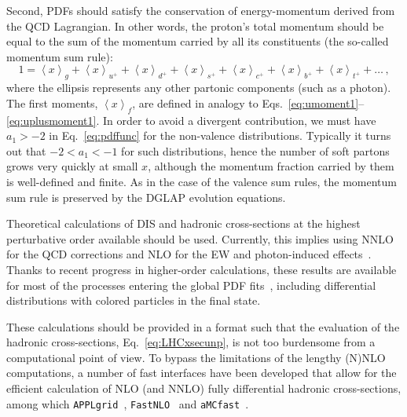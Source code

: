 Second, PDFs should satisfy the conservation of energy-momentum derived from
the QCD Lagrangian.
%
In other words, the proton's total momentum should be equal 
to the sum of the momentum carried by all its constituents
(the so-called momentum sum rule):
\begin{equation}
\label{eq:mom}
1 
= 
\left\langle x\right\rangle _{g}
+
\left\langle x\right\rangle _{u^{+}}
+
\left\langle x\right\rangle _{d^{+}}
+
\left\langle x\right\rangle _{s^{+}}
+
\left\langle x\right\rangle _{c^{+}}
+
\left\langle x\right\rangle _{b^{+}}
+
\left\langle x\right\rangle _{t^{+}}+\ldots\,,
\end{equation}
%
where the ellipsis represents any other partonic components (such
as a photon). 
%
The first moments, $\left\langle x\right\rangle _{f}$, are defined in analogy 
to Eqs.~\eqref{eq:umoment1}--\eqref{eq:uplusmoment1}. 
%
In order to avoid a divergent contribution, we must have $a_1>-2$ in 
Eq.~\eqref{eq:pdffunc} for the non-valence distributions.
%
Typically it turns out that $-2<a_1<-1$ for such distributions, hence 
the number of soft partons grows very quickly at small $x$, although the 
momentum fraction carried by them is well-defined and finite.
%
As in the case of the valence sum rules, the momentum
sum rule is preserved by the DGLAP evolution equations.

Theoretical calculations of DIS and hadronic cross-sections at the highest 
perturbative order available should be used.
%
Currently, this implies using NNLO for the QCD corrections and NLO
for the EW and photon-induced effects~\cite{Manohar:2016nzj,Manohar:2017eqh}.
%
Thanks to recent progress in higher-order calculations, these results
are available for most of the processes entering the global
PDF fits~\cite{Currie:2016bfm,Campbell:2016lzl,Czakon:2016dgf,
Boughezal:2017nla,Li:2012wna}, including differential distributions with 
colored particles in the final state.

These calculations should be provided in
a format such that the evaluation of the hadronic
cross-sections, Eq.~\eqref{eq:LHCxsecunp}, is not too burdensome
from a computational point of view.
%
To bypass the limitations of the lengthy (N)NLO
computations, a number of fast interfaces have
been developed that allow for the efficient calculation
of NLO (and NNLO) fully differential hadronic cross-sections,
among which {\tt APPLgrid}~\cite{Carli:2010rw},
{\tt FastNLO}~\cite{Wobisch:2011ij} and {\tt aMCfast}~\cite{Bertone:2014zva}.

